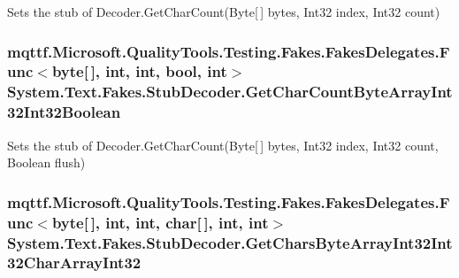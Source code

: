 Sets the stub of Decoder.\-Get\-Char\-Count(\-Byte\mbox{[}$\,$\mbox{]} bytes, Int32 index, Int32 count)

\hypertarget{class_system_1_1_text_1_1_fakes_1_1_stub_decoder_ac0b9d7836839749ab30fb4506c8918cb}{
\subsubsection[{Get\-Char\-Count\-Byte\-Array\-Int32\-Int32\-Boolean}]{\setlength{\rightskip}{0pt plus 5cm}mqttf.\-Microsoft.\-Quality\-Tools.\-Testing.\-Fakes.\-Fakes\-Delegates.\-Func$<$byte\mbox{[}$\,$\mbox{]}, int, int, bool, int$>$ System.\-Text.\-Fakes.\-Stub\-Decoder.\-Get\-Char\-Count\-Byte\-Array\-Int32\-Int32\-Boolean}}\label{class_system_1_1_text_1_1_fakes_1_1_stub_decoder_ac0b9d7836839749ab30fb4506c8918cb}


Sets the stub of Decoder.\-Get\-Char\-Count(\-Byte\mbox{[}$\,$\mbox{]} bytes, Int32 index, Int32 count, Boolean flush)

\hypertarget{class_system_1_1_text_1_1_fakes_1_1_stub_decoder_a38b7c2549e0ade7ce097b4ff60446ed1}{
\subsubsection[{Get\-Chars\-Byte\-Array\-Int32\-Int32\-Char\-Array\-Int32}]{\setlength{\rightskip}{0pt plus 5cm}mqttf.\-Microsoft.\-Quality\-Tools.\-Testing.\-Fakes.\-Fakes\-Delegates.\-Func$<$byte\mbox{[}$\,$\mbox{]}, int, int, char\mbox{[}$\,$\mbox{]}, int, int$>$ System.\-Text.\-Fakes.\-Stub\-Decoder.\-Get\-Chars\-Byte\-Array\-Int32\-Int32\-Char\-Array\-Int32}}\label{class_system_1_1_text_1_1_fakes_1_1_stub_decoder_a38b7c2549e0ade7ce097b4ff60446ed1}



